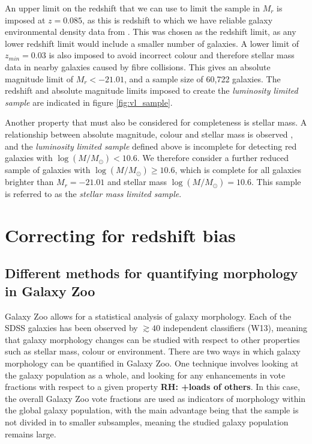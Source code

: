\documentclass[useAMS,usenatbib]{mn2e}
\newcommand{\rh}[1]{{\bf \textcolor{RoyalPurple}{RH: #1}}}
\begin{document}
An upper limit on the redshift that we can use to limit the sample in $M_r$ is imposed at $z=0.085$, as this is redshift to which we have reliable galaxy environmental density data from \cite{Baldry_06}. This was chosen as the redshift limit, as any lower redshift limit would include a smaller number of galaxies. A lower limit of $z_{min}=0.03$ is also imposed to avoid incorrect colour and therefore stellar mass data in nearby galaxies caused by fibre collisions. This gives an absolute magnitude limit of $M_r<-21.01$, and a sample size of 60,722 galaxies. The redshift and absolute magnitude limits imposed to create the \textit{luminosity limited sample} are indicated in figure \ref{fig:vl_sample}. 

Another property that must also be considered for completeness is stellar mass. A relationship between absolute magnitude, colour and stellar mass is observed \citep{Baldry_06}, and the \textit{luminosity limited sample} defined above is incomplete for detecting red galaxies with $\log (M/M_{\odot}) < 10.6$. We therefore consider a further reduced sample of galaxies with $\log (M/M_{\odot}) \geq 10.6$, which is complete for all galaxies brighter than $M_r = -21.01$ and stellar mass $\log (M/M_{\odot}) = 10.6$.  This sample is referred to as the \textit{stellar mass limited sample}.


\section{Correcting for redshift bias}

\subsection{Different methods for quantifying morphology in Galaxy Zoo}
\label{sec:comaprison_methods}

Galaxy Zoo allows for a statistical analysis of galaxy morphology. Each of the SDSS galaxies has been observed by $\gtrsim 40$ independent classifiers (W13), meaning that galaxy morphology changes can be studied with respect to other properties such as stellar mass, colour or environment. There are two ways in which galaxy morphology can be quantified in Galaxy Zoo. One technique involves looking at the galaxy population as a whole, and looking for any enhancements in vote fractions with respect to a given property \citep{Bamford_09,Casteels_13,Willett_15}\rh{+loads of others}. In this case, the overall Galaxy Zoo vote fractions are used as indicators of morphology within the global galaxy population, with the main advantage being that the sample is not divided in to smaller subsamples, meaning the studied galaxy population remains large.
\end{document}
